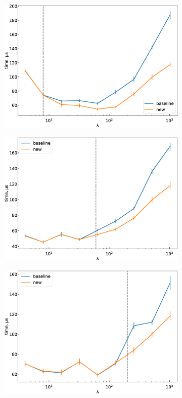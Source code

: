 \documentclass{amsart}
\numberwithin{equation}{section}
\begin{document}
\begin{figure}[h]
	\centering
	\begin{subfigure}[t]{0.3\textwidth}
		\includegraphics[width=\linewidth]{boost_k_fixed_2.eps}
        \caption{}\label{boost-k-fixed_2}
	\end{subfigure}
	\begin{subfigure}[t]{0.3\textwidth}
		\includegraphics[width=\linewidth]{boost_k_fixed_15.eps}
		\caption{}\label{boost-k-fixed_15}
	\end{subfigure}
	\begin{subfigure}[t]{0.3\textwidth}
		\includegraphics[width=\linewidth]{boost_k_fixed_50.eps}

\end{subfigure}
\end{figure}
\end{document}
